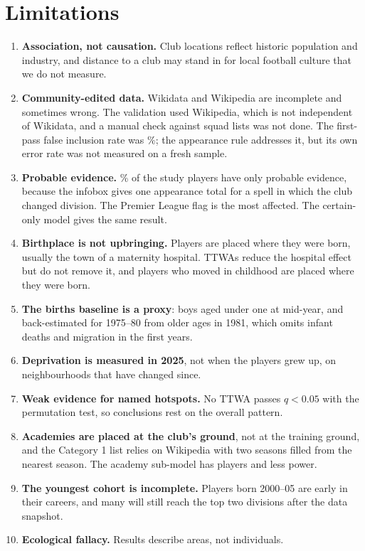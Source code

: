 \section{Limitations}
\label{sec:limitations}

\begin{enumerate}
  \item \textbf{Association, not causation.} Club locations reflect historic population and industry, and distance to a club may stand in for local football culture that we do not measure.
  \item \textbf{Community-edited data.} Wikidata and Wikipedia are incomplete and sometimes wrong. The validation used Wikipedia, which is not independent of Wikidata, and a manual check against squad lists was not done. The first-pass false inclusion rate was \valFIpct\%; the appearance rule addresses it, but its own error rate was not measured on a fresh sample.
  \item \textbf{Probable evidence.} \shareProbable\% of the study players have only probable evidence, because the infobox gives one appearance total for a spell in which the club changed division. The Premier League flag is the most affected. The certain-only model gives the same result.
  \item \textbf{Birthplace is not upbringing.} Players are placed where they were born, usually the town of a maternity hospital. TTWAs reduce the hospital effect but do not remove it, and players who moved in childhood are placed where they were born.
  \item \textbf{The births baseline is a proxy}: boys aged under one at mid-year, and back-estimated for 1975--80 from older ages in 1981, which omits infant deaths and migration in the first years.
  \item \textbf{Deprivation is measured in 2025}, not when the players grew up, on neighbourhoods that have changed since.
  \item \textbf{Weak evidence for named hotspots.} No TTWA passes $q<0.05$ with the permutation test, so conclusions rest on the overall pattern.
  \item \textbf{Academies are placed at the club's ground}, not at the training ground, and the Category 1 list relies on Wikipedia with two seasons filled from the nearest season. The academy sub-model has \nAcadPlayers{} players and less power.
  \item \textbf{The youngest cohort is incomplete.} Players born 2000--05 are early in their careers, and many will still reach the top two divisions after the data snapshot.
  \item \textbf{Ecological fallacy.} Results describe areas, not individuals.
\end{enumerate}
